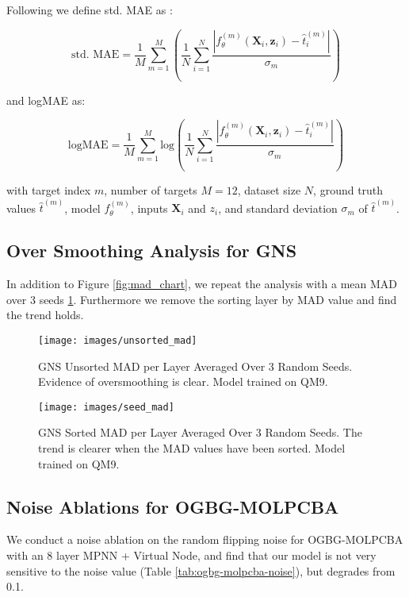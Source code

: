 \documentclass{article} \usepackage{iclr2022_conference,times}
\begin{document}
Following \cite{Klicpera2020DirectionalMP} we define std. MAE as :

\[
\text{std. MAE} = \frac{1}{M}\sum^{M}_{m=1}\left(\frac{1}{N}\sum^{N}_{i=1}\frac{|f_{\theta}^{(m)}(\bm{X}_i, \bm{z}_i)-\hat{t}_i^{(m)}|}{\sigma_m}\right)
\]

and logMAE as:

\[
\text{logMAE} = \frac{1}{M}\sum^{M}_{m=1}\text{log}\left(\frac{1}{N}\sum^{N}_{i=1}\frac{|f_{\theta}^{(m)}(\bm{X}_i, \bm{z}_i)-\hat{t}_i^{(m)}|}{\sigma_m}\right)
\]

with target index $m$, number of targets $M=12$, dataset size $N$, ground truth values $\hat{t}^{(m)}$, model $f_{\theta}^{(m)}$, inputs $\bm{X}_i$ and $z_i$, and standard deviation $\sigma_m$ of $\hat{t}^{(m)}$.

\subsection{Over Smoothing Analysis for GNS}

In addition to Figure \ref{fig:mad_chart}, we repeat the analysis with a mean MAD over 3 seeds \ref{fig:seed_mad}. Furthermore we remove the sorting layer by MAD value and find the trend holds.

\begin{figure}[]
    \centering
    \begin{minipage}{0.45\textwidth}
            \centering
            \texttt{[image: images/unsorted\_mad]}
            \caption{GNS Unsorted MAD per Layer Averaged Over 3 Random Seeds. Evidence of oversmoothing is clear. Model trained on QM9.}
            \label{fig:unsorted_mad}
    \end{minipage}\hfill
    \begin{minipage}{0.45\textwidth}
        \centering
            \texttt{[image: images/seed\_mad]}
            \caption{GNS Sorted MAD per Layer Averaged Over 3 Random Seeds. The trend is clearer when the MAD values have been sorted. Model trained on QM9.}
            \label{fig:seed_mad}
    \end{minipage}
\end{figure}

\subsection{Noise Ablations for OGBG-MOLPCBA}\label{noise-ogbg-molpcba}

We conduct a noise ablation on the random flipping noise for OGBG-MOLPCBA with an 8 layer MPNN + Virtual Node, and find that our model is not very sensitive to the noise value (Table \ref{tab:ogbg-molpcba-noise}), but degrades from 0.1.
\end{document}
